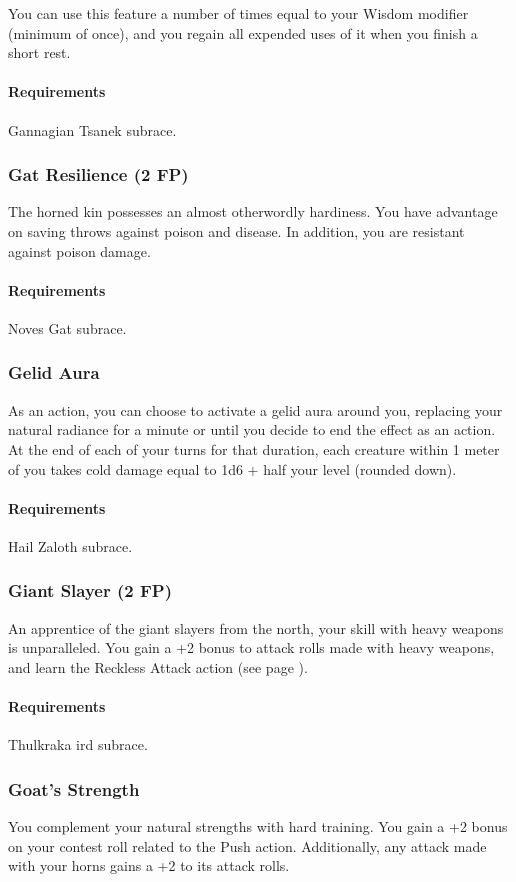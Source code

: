     You can use this feature a number of times equal to your Wisdom modifier (minimum of once), and you regain all expended uses of it when you finish a short rest.
    \paragraph{Requirements} Gannagian Tsanek subrace.
\subsubsection{Gat Resilience (2 FP)} \label{feat::gatresilience}
    The horned kin possesses an almost otherwordly hardiness.
    You have advantage on saving throws against poison and disease.
    In addition, you are resistant against poison damage.
    \paragraph{Requirements} Noves Gat subrace.
\subsubsection{Gelid Aura} \label{feat::gelidaura}
    As an action, you can choose to activate a gelid aura around you, replacing your natural radiance for a minute or until you decide to end the effect as an action.
    At the end of each of your turns for that duration, each creature within 1 meter of you takes cold damage equal to 1d6 + half your level (rounded down).
    \paragraph{Requirements} Hail Zaloth subrace.
\subsubsection{Giant Slayer (2 FP)} \label{feat::giantslayer}
    An apprentice of the giant slayers from the north, your skill with heavy weapons is unparalleled.
    You gain a +2 bonus to attack rolls made with heavy weapons, and learn the Reckless Attack action (see page \pageref{act::recklessattack}).
    \paragraph{Requirements} Thulkraka ird subrace.
\subsubsection{Goat's Strength} \label{feat::goatsstrength}
    You complement your natural strengths with hard training.
    You gain a +2 bonus on your contest roll related to the Push action.
    Additionally, any attack made with your horns gains a +2 to its attack rolls.

